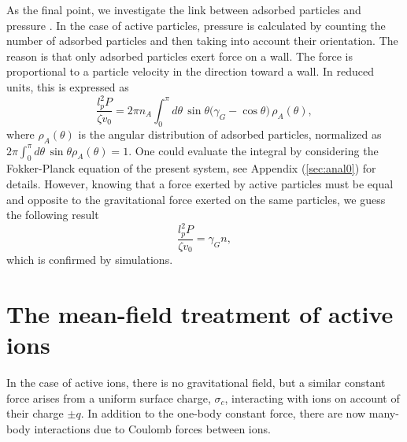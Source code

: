 \documentclass[pre,twocolumn,graphicx]{revtex4-1}
\newcommand{\be}{\begin{equation}}
\newcommand{\ee}{\end{equation}}
\begin{document}
As the final point, we investigate the link between adsorbed particles and pressure 
\cite{Brady14,Cates15a,Cates15b,Dean18}.  In the case of active particles, pressure is calculated 
by counting the number of adsorbed particles and then taking into account their orientation.  
The reason is that only adsorbed particles exert force on a wall.  The force is 
proportional to a particle velocity in the direction toward a wall.  In reduced units, this is expressed as 
\be
\frac{l_p^2 P}{\zeta v_0} = 2\pi n_A \int_{0}^{\pi}  d\theta\, \sin\theta \big(\gamma_G - \cos\theta) \, \rho_A(\theta),
\ee 
where $\rho_A(\theta)$ is the angular distribution of adsorbed particles, normalized as 
$2\pi \int_0^{\pi}d\theta\, \sin\theta\rho_A(\theta)=1$.  One could evaluate the integral by considering the 
Fokker-Planck equation of the present system, see Appendix (\ref{sec:anal0}) for details.  However, 
knowing that a force exerted by active particles must be equal and opposite to the gravitational force exerted on 
the same particles, we guess the following result
\be
\frac{l_p^2 P}{\zeta v_0} = \gamma_G n, 
\ee
which is confirmed by simulations.  

































\section{The mean-field treatment of active ions}
\label{sec:mf}



In the case of active ions, there is no gravitational field, but a similar constant force arises from a uniform 
surface charge, $\sigma_c$, interacting with ions on account of their charge $\pm q$.  In addition to the one-body
constant force, there are now many-body interactions due to Coulomb forces between ions.  
\end{document}
